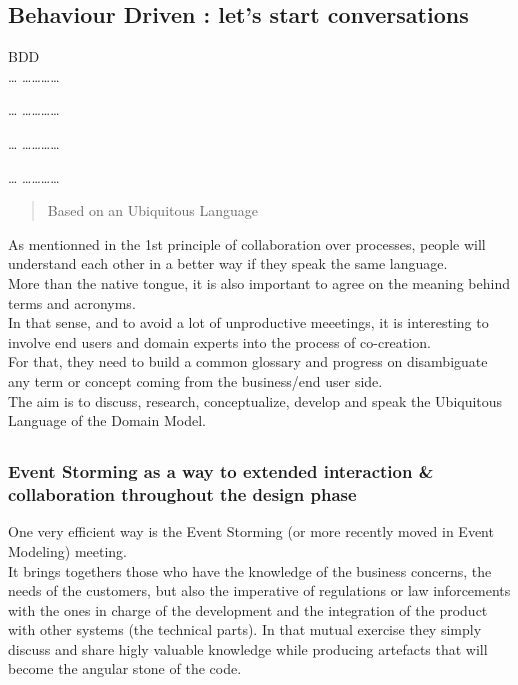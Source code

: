 \subsection{Behaviour Driven : let's start
conversations}\label{behaviour-driven-lets-start-conversations}

BDD\\ \ldots{} \ldots{}\ldots{}\ldots{}\ldots{}

\ldots{} \ldots{}\ldots{}\ldots{}\ldots{}

\ldots{} \ldots{}\ldots{}\ldots{}\ldots{}

\ldots{} \ldots{}\ldots{}\ldots{}\ldots{}

\begin{quote}
Based on an Ubiquitous Language
\end{quote}

As mentionned in the 1st principle of collaboration over processes,
people will understand each other in a better way if they speak the same
language.\\More than the native tongue, it is also important to agree on
the meaning behind terms and acronyms.\\In that sense, and to avoid a
lot of unproductive meeetings, it is interesting to involve end users
and domain experts into the process of co-creation.\\For that, they need
to build a common glossary and progress on disambiguate any term or
concept coming from the business/end user side.\\The aim is to discuss,
research, conceptualize, develop and speak the Ubiquitous Language of
the Domain Model.

\subsection{}\label{section}

\subsubsection{Event Storming as a way to extended interaction \&
collaboration throughout the design
phase}\label{event-storming-as-a-way-to-extended-interaction-collaboration-throughout-the-design-phase}

One very efficient way is the Event Storming (or more recently moved in
Event Modeling) meeting.\\It brings togethers those who have the
knowledge of the business concerns, the needs of the customers, but also
the imperative of regulations or law inforcements with the ones in
charge of the development and the integration of the product with other
systems (the technical parts). In that mutual exercise they simply
discuss and share higly valuable knowledge while producing artefacts
that will become the angular stone of the code.


